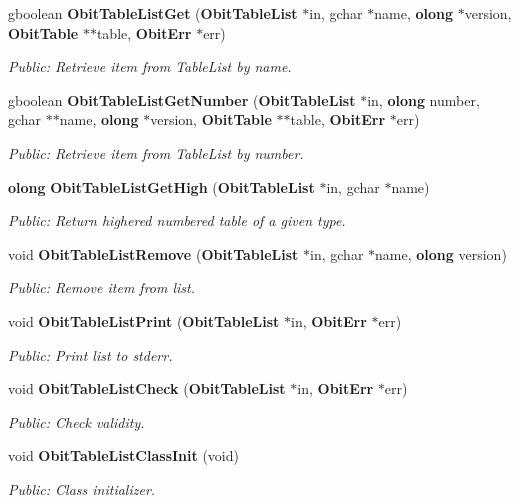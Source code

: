 \begin{CompactItemize}
gboolean {\bf Obit\-Table\-List\-Get} ({\bf Obit\-Table\-List} $\ast$in, gchar $\ast$name, {\bf olong} $\ast$version, {\bf Obit\-Table} $\ast$$\ast$table, {\bf Obit\-Err} $\ast$err)
\begin{CompactList}\small\item\em Public: Retrieve item from Table\-List by name. \item\end{CompactList}\item 
gboolean {\bf Obit\-Table\-List\-Get\-Number} ({\bf Obit\-Table\-List} $\ast$in, {\bf olong} number, gchar $\ast$$\ast$name, {\bf olong} $\ast$version, {\bf Obit\-Table} $\ast$$\ast$table, {\bf Obit\-Err} $\ast$err)
\begin{CompactList}\small\item\em Public: Retrieve item from Table\-List by number. \item\end{CompactList}\item 
{\bf olong} {\bf Obit\-Table\-List\-Get\-High} ({\bf Obit\-Table\-List} $\ast$in, gchar $\ast$name)
\begin{CompactList}\small\item\em Public: Return highered numbered table of a given type. \item\end{CompactList}\item 
void {\bf Obit\-Table\-List\-Remove} ({\bf Obit\-Table\-List} $\ast$in, gchar $\ast$name, {\bf olong} version)
\begin{CompactList}\small\item\em Public: Remove item from list. \item\end{CompactList}\item 
void {\bf Obit\-Table\-List\-Print} ({\bf Obit\-Table\-List} $\ast$in, {\bf Obit\-Err} $\ast$err)
\begin{CompactList}\small\item\em Public: Print list to stderr. \item\end{CompactList}\item 
void {\bf Obit\-Table\-List\-Check} ({\bf Obit\-Table\-List} $\ast$in, {\bf Obit\-Err} $\ast$err)
\begin{CompactList}\small\item\em Public: Check validity. \item\end{CompactList}\item 
void {\bf Obit\-Table\-List\-Class\-Init} (void)
\begin{CompactList}\small\item\em Public: Class initializer. \item\end{CompactList}\end{CompactItemize}


